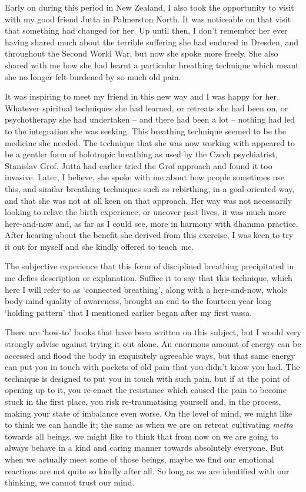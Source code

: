 Early on during this period in New Zealand, I also took the opportunity
to visit with my good friend Jutta in Palmerston North. It was
noticeable on that visit that something had changed for her. Up until
then, I don't remember her ever having shared much about the terrible
suffering she had endured in Dresden, and throughout the Second World
War, but now she spoke more freely. She also shared with me how she had
learnt a particular breathing technique which meant she no longer felt
burdened by so much old pain.

It was inspiring to meet my friend in this new way and I was happy for
her. Whatever spiritual techniques she had learned, or retreats she had
been on, or psychotherapy she had undertaken -- and there had been a lot
-- nothing had led to the integration she was seeking. This breathing
technique seemed to be the medicine she needed. The technique that she
was now working with appeared to be a gentler form of holotropic
breathing as used by the Czech psychiatrist, Stanislav Grof\cite{grof}.
Jutta had earlier tried the Grof approach and found it
too invasive. Later, I believe, she spoke with me about how people
sometimes use this, and similar breathing techniques such as rebirthing,
in a goal-oriented way, and that she was not at all keen on that
approach. Her way was not necessarily looking to relive the birth
experience, or uncover past lives, it was much more here-and-now and, as
far as I could see, more in harmony with dhamma practice. After hearing
about the benefit she derived from this exercise, I was keen to try it
out for myself and she kindly offered to teach~me.

The subjective experience that this form of disciplined breathing
precipitated in me defies description or explanation. Suffice it to say
that this technique, which here I will refer to as `connected
breathing', along with a here-and-now, whole body-mind quality of
awareness, brought an end to the fourteen year long `holding pattern'
that I mentioned earlier began after my first vassa.

There are `how-to' books that have been written on this subject, but I
would very strongly advise against trying it out alone. An enormous
amount of energy can be accessed and flood the body in exquisitely
agreeable ways, but that same energy can put you in touch with pockets
of old pain that you didn't know you had. The technique is designed to
put you in touch with such pain, but if at the point of opening up to
it, you re-enact the resistance which caused the pain to become stuck in
the first place, you risk re-traumatising yourself and, in the process,
making your state of imbalance even worse. On the level of mind, we
might like to think we can handle it; the same as when we are on retreat
cultivating \emph{metta} towards all beings, we might like to think that from
now on we are going to always behave in a kind and caring manner towards
absolutely everyone. But when we actually meet some of those beings,
maybe we find our emotional reactions are not quite so kindly after all.
So long as we are identified with our thinking, we cannot trust our
mind.

